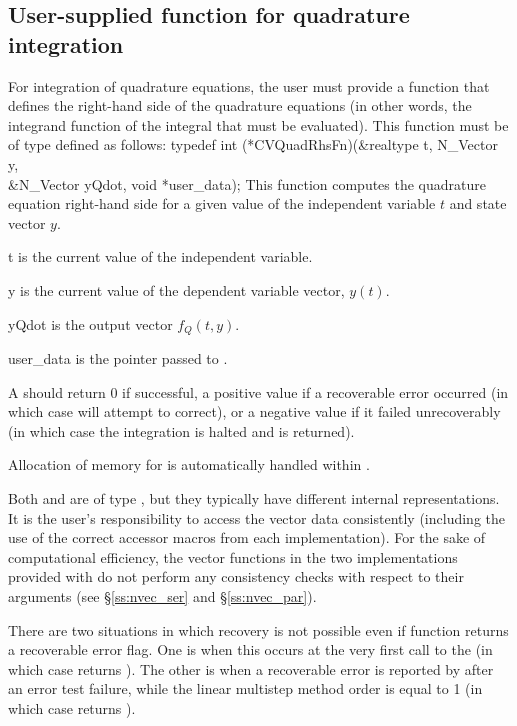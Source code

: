 
\subsection{User-supplied function for quadrature integration}
\label{ss:user_fct_quad}

For integration of quadrature equations, the user must provide a function 
that defines the right-hand side of the quadrature equations (in other words,
the integrand function of the integral that must be evaluated). This function
must be of type  defined as follows:
{
  typedef int (*CVQuadRhsFn)(&realtype t, N\_Vector y, \\
                             &N\_Vector yQdot, void *user\_data);
}
{
  This function computes the quadrature equation right-hand side for a given value
  of the independent variable $t$ and state vector $y$.
}
{
  \begin{args}
  \item[t]
    is the current value of the independent variable.
  \item[y]
    is the current value of the dependent variable vector, $y(t)$.
  \item[yQdot]
    is the output vector $f_Q(t,y)$.
  \item[user\_data]
    is the  pointer passed to .   
  \end{args}
}
{
  A  should return 0 if successful, a positive value if a recoverable
  error occurred (in which case {\cvodes} will attempt to correct), or a negative 
  value if it failed unrecoverably (in which case the integration is halted and
   is returned).
}
{
  Allocation of memory for  is automatically handled within {\cvodes}.

  Both  and  are of type ,
  but they  typically have different internal representations. It is the user's 
  responsibility to access the vector data consistently (including the use of the 
  correct accessor macros from each {\nvector} implementation). For the sake of 
  computational efficiency, the vector functions in the two {\nvector} implementations 
  provided with {\cvodes} do not perform any consistency checks with respect to their 
   arguments (see \S\ref{ss:nvec_ser} and \S\ref{ss:nvec_par}).

  There are two situations in which recovery is not possible even if 
  function returns a recoverable error flag.  One is when this occurs at the
  very first call to the  (in which case {\cvodes} returns
  ).  The other is when a recoverable error is reported
  by  after an error test failure, while the linear multistep method
  order is equal to 1 (in which case {\cvodes} returns ).
}


